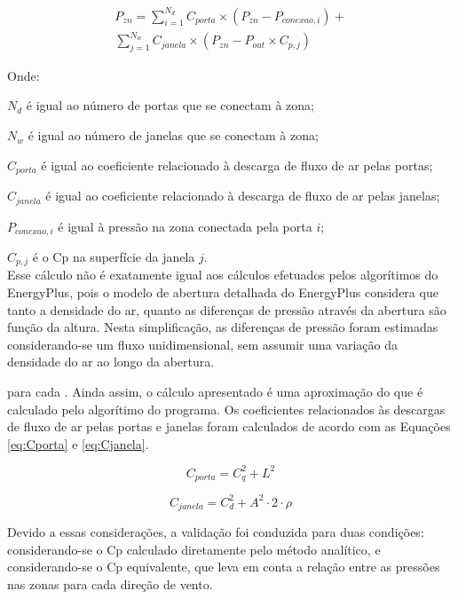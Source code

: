 \documentclass[brazil,hardcopy,openany,a5paper]{ufscthesis}
\begin{document}
		 \begin{equation}\label{eq:P}
		 \begin{split}
		 P_{zn} = \sum_{i=1}^{N_d}{C_{porta}\times(P_{zn} - P_{conexao,i})} + \\ %
		 \sum_{j=1}^{N_w}{C_{janela}\times(P_{zn} - P_{out}\times C_{p,j})}
		 \end{split}
		 \end{equation}
		
		Onde:
		
		$N_d$ é igual ao número de portas que se conectam à zona;
		
		$N_w$ é igual ao número de janelas que se conectam à zona;
		
		$C_{porta}$ é igual ao coeficiente relacionado à descarga de fluxo de ar pelas portas;
		
		$C_{janela}$ é igual ao coeficiente relacionado à descarga de fluxo de ar pelas janelas;
		
		$P_{conexao,i}$ é igual à pressão na zona conectada pela porta $i$;
		
		$C_{p,j}$ é o Cp na superfície da janela $j$.
		\\
		
		Esse cálculo não é exatamente igual aos cálculos efetuados pelos algorítimos do EnergyPlus, pois o modelo de abertura detalhada do EnergyPlus considera que tanto a densidade do ar, quanto as diferenças de pressão através da abertura são função da altura.
		Nesta simplificação, as diferenças de pressão foram estimadas considerando-se um fluxo unidimensional, sem assumir uma variação da densidade do ar ao longo da abertura.
		
		para cada . Ainda assim, o cálculo apresentado é uma aproximação do que é calculado pelo algorítimo do programa.
		Os coeficientes relacionados às descargas de fluxo de ar pelas portas e janelas foram calculados de acordo com as Equações \ref{eq:Cporta} e \ref{eq:Cjanela}.
		
		\begin{equation}\label{eq:Cporta}
		C_{porta} = C_q^{2}+L^{2}
		\end{equation}
		
		\begin{equation}\label{eq:Cjanela}
		C_{janela} = C_d^{2}+A^{2} \cdot 2 \cdot \rho
		\end{equation}
		
		
			
		Devido a essas considerações, a validação foi conduzida para duas condições: considerando-se o Cp calculado diretamente pelo método analítico, e considerando-se o Cp equivalente, que leva em conta a relação entre as pressões nas zonas para cada direção de vento.
		
\end{document}
